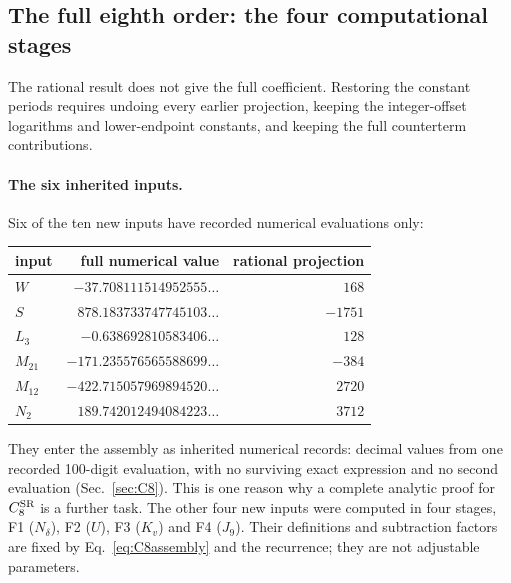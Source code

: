 \documentclass[11pt,a4paper]{article}
\numberwithin{equation}{section}
\newcommand{\CSR}{C^{\rm SR}}
\begin{document}
\subsection{The full eighth order: the four computational stages}\label{app:dualC:C8packages}
The rational result does not give the full coefficient. Restoring the constant periods requires undoing every earlier
projection, keeping the integer-offset logarithms and lower-endpoint constants, and keeping the full counterterm
contributions.

\paragraph{The six inherited inputs.} Six of the ten new inputs have recorded numerical evaluations only:
\begin{center}\small
\begin{tabular}{@{}lrr@{}}
\toprule
input & full numerical value & rational projection\\
\midrule
$W$ & $-37.708111514952555\ldots$ & $168$\\
$S$ & $878.183733747745103\ldots$ & $-1751$\\
$L_3$ & $-0.638692810583406\ldots$ & $128$\\
$M_{21}$ & $-171.235576565588699\ldots$ & $-384$\\
$M_{12}$ & $-422.715057969894520\ldots$ & $2720$\\
$N_2$ & $189.742012494084223\ldots$ & $3712$\\
\bottomrule
\end{tabular}
\end{center}
They enter the assembly as inherited numerical records: decimal values from one recorded 100-digit evaluation, with no
surviving exact expression and no second evaluation (Sec.~\ref{sec:C8}). This is one reason why a complete analytic
proof for $\CSR_8$ is a further task. The other four new inputs were computed in four stages, F1 ($N_\delta$), F2
($U$), F3 ($K_v$) and F4 ($J_9$). Their definitions and subtraction factors are fixed by Eq.~\eqref{eq:C8assembly}
and the recurrence; they are not adjustable parameters.
\end{document}
